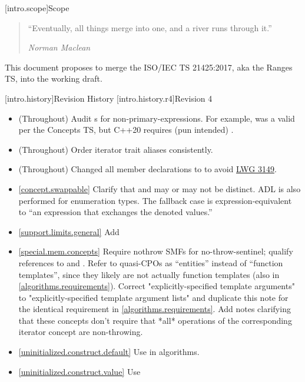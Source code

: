 [intro.scope]{Scope}

\begin{quote}
``Eventually, all things merge into one, and a river runs through it.''
\begin{flushright}
\textemdash \textit{Norman Maclean}
\end{flushright}
\end{quote}

\pnum
This document proposes to merge the ISO/IEC TS 21425:2017, aka the Ranges TS,
into the working draft.

[intro.history]{Revision History}
[intro.history.r4]{Revision 4}
\begin{itemize}
\item (Throughout) Audit s for
  non-primary-expressions. For example,  was a valid
   per the Concepts TS, but C++20 requires
  (pun intended) .
\item (Throughout) Order iterator trait aliases consistently.
\item (Throughout) Changed all  member declarations to
   to avoid \href{https://wg21.link/LWG3149}{LWG 3149}.
\item \ref{concept.swappable} Clarify that  and  may or
  may not be distinct. ADL is also performed for enumeration types.
  The fallback case is expression-equivalent to ``an expression that exchanges
  the denoted values.''
\item \ref{support.limits.general} Add 
\item \ref{special.mem.concepts} Require nothrow SMFs for no-throw-sentinel;
  qualify references to  and .
  Refer to quasi-CPOs as ``entities'' instead of ``function templates'', since
  they likely are not actually function templates (also in
  \ref{algorithms.requirements}).
  Correct "explicitly-specified template arguments" to
  "explicitly-specified template argument lists" and duplicate this note for the
  identical requirement in \ref{algorithms.requirements}.
  Add notes clarifying that these concepts don't require that *all* operations
  of the corresponding iterator concept are non-throwing.
\item \ref{uninitialized.construct.default} Use 
  in  algorithms.
\item \ref{uninitialized.construct.value} Use 

\end{itemize}
